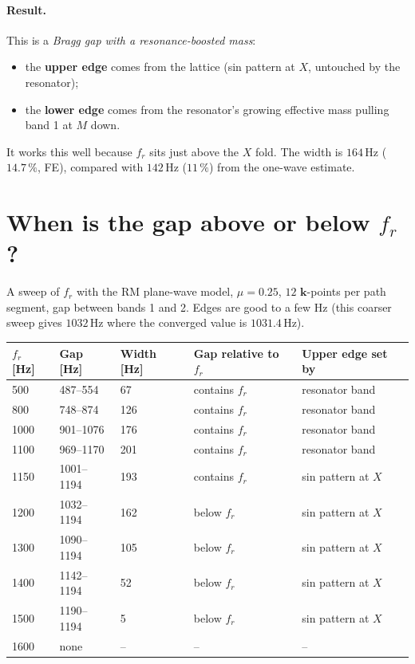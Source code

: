 \paragraph{Result.}
This is a \emph{Bragg gap with a resonance-boosted mass}:
\begin{itemize}
  \item the \textbf{upper edge} comes from the lattice (sin pattern at $X$,
        untouched by the resonator);
  \item the \textbf{lower edge} comes from the resonator's growing effective
        mass pulling band 1 at $M$ down.
\end{itemize}
It works this well because $f_r$ sits just above the $X$ fold. The width is
$164\,\mathrm{Hz}$ ($14.7\,\%$, FE), compared with $142\,\mathrm{Hz}$ ($11\,\%$)
from the one-wave estimate.

\section{When is the gap above or below $f_r$?}
\label{sec:gap_regimes}

A sweep of $f_r$ with the RM plane-wave model, $\mu = 0.25$, $12$ $\mathbf{k}$-points
per path segment, gap between bands 1 and 2. Edges are good to a few Hz (this
coarser sweep gives $1032\,\mathrm{Hz}$ where the converged value is
$1031.4\,\mathrm{Hz}$).
\begin{center}
\begin{tabular}{|l|l|l|l|l|}
\hline
$f_r$ [Hz] & Gap [Hz] & Width [Hz] & Gap relative to $f_r$ & Upper edge set by \\
\hline
500 & 487--554 & 67 & contains $f_r$ & resonator band \\
800 & 748--874 & 126 & contains $f_r$ & resonator band \\
1000 & 901--1076 & 176 & contains $f_r$ & resonator band \\
1100 & 969--1170 & 201 & contains $f_r$ & resonator band \\
1150 & 1001--1194 & 193 & contains $f_r$ & sin pattern at $X$ \\
1200 & 1032--1194 & 162 & below $f_r$ & sin pattern at $X$ \\
1300 & 1090--1194 & 105 & below $f_r$ & sin pattern at $X$ \\
1400 & 1142--1194 & 52 & below $f_r$ & sin pattern at $X$ \\
1500 & 1190--1194 & 5 & below $f_r$ & sin pattern at $X$ \\
1600 & none & -- & -- & -- \\
\hline
\end{tabular}
\end{center}

